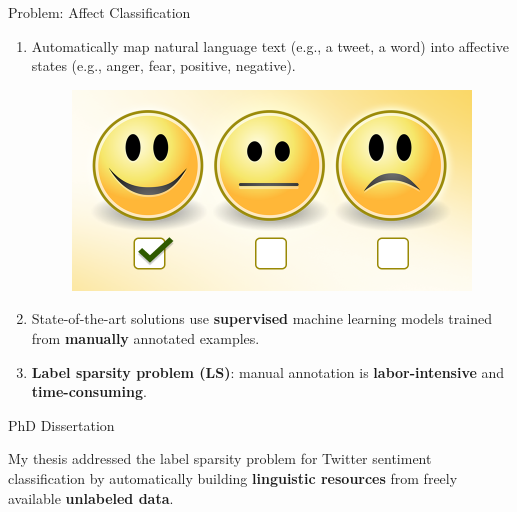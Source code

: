 \documentclass[handout]{beamer}
\begin{document}
\begin{frame}{Problem: Affect Classification}
\begin{scriptsize}
  \begin{enumerate}
   \item Automatically map natural language text (e.g., a tweet, a word) into affective states (e.g., anger, fear, positive, negative).
   
     \begin{figure}[h]
        	\includegraphics[scale = 0.15]{pics/sent.png}
        \end{figure}
   \item State-of-the-art solutions use \textbf{supervised} machine learning models trained from \textbf{manually} annotated examples.
   \item \textbf{Label sparsity problem (LS)}: manual annotation is \textbf{labor-intensive} and \textbf{time-consuming}. 
  \end{enumerate} 
\end{scriptsize}

\end{frame}



\begin{frame}{PhD Dissertation}

My thesis addressed the label sparsity problem for Twitter sentiment classification by automatically building \textbf{linguistic resources} from freely available \textbf{unlabeled data}. 


\end{frame}
\end{document}

